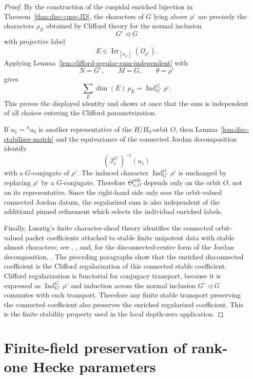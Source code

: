 \documentclass{amsart}
\theoremstyle{plain}
\numberwithin{equation}{section}
\theoremstyle{definition}
\renewcommand{\dim}{\operatorname{dim}}
\newcommand{\Ind}{\operatorname{Ind}}
\newcommand{\Irr}{\operatorname{Irr}}
\newcommand{\J}{\mathbb{J}}
\begin{document}
\begin{proof}
By the construction of the cuspidal enriched bijection in
Theorem~\ref{thm:disc-cusp-JD}, the characters of \(G\) lying above
\(\rho^\circ\) are precisely the characters \(\rho_E\) obtained by Clifford
theory for the normal inclusion
\[
        G^\circ\lhd G
\]
with projective label
\[
        E\in\Irr_{[\alpha_{\rho^\circ}]}(\Omega_{\rho^\circ}).
\]
Applying Lemma~\ref{lem:clifford-regular-sum-independent} with
\[
        N=G^\circ,
        \qquad
        M=G,
        \qquad
        \theta=\rho^\circ
\]
gives
\[
        \sum_E \dim(E)\,\rho_E
        =
        \Ind_{G^\circ}^{G}\rho^\circ .
\]
This proves the displayed identity and shows at once that the sum is independent
of all choices entering the Clifford parametrization.

If \(u_1={}^h u_0\) is another representative of the \(H/H_0\)-orbit \(O\), then
Lemma~\ref{lem:disc-stabilizer-match} and the equivariance of the connected
Jordan decomposition identify
\[
        (\J_s^{G^\circ})^{-1}(u_1)
\]
with a \(G\)-conjugate of \(\rho^\circ\).  The induced character
\(\Ind_{G^\circ}^{G}\rho^\circ\) is unchanged by replacing \(\rho^\circ\) by a
\(G\)-conjugate.  Therefore \(\Theta^{\mathrm{enh}}_{s,O}\) depends only on the
orbit \(O\), not on its representative.  Since the right-hand side only sees the
orbit-valued connected Jordan datum, the regularized sum is also independent of
the additional pinned refinement which selects the individual enriched labels.

Finally, Lusztig's finite character-sheaf theory identifies the connected
orbit-valued packet coefficients attached to stable finite unipotent data with
stable almost characters; see \cite[Ch.~13]{Lus84}, \cite{LusztigCS5}, and, for
the disconnected-centre form of the Jordan decomposition, \cite{Lus88,DM90}.
The preceding paragraphs show that the enriched disconnected coefficient is the
Clifford regularization of this connected stable coefficient.  Clifford
regularization is functorial for conjugacy transport, because it is expressed as
\(\Ind_{G^\circ}^{G}\rho^\circ\) and induction across the normal inclusion
\(G^\circ\lhd G\) commutes with such transport.  Therefore any finite stable
transport preserving the connected coefficient also preserves the enriched
regularized coefficient.  This is the finite stability property used in the
local depth-zero application.
\end{proof}


\section{Finite-field preservation of rank-one Hecke parameters}
\label{sec:finite-rank-one-parameter-comparison}
\end{document}

